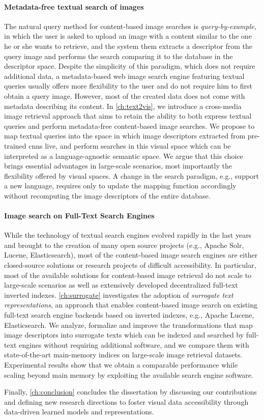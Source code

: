 \paragraph{Metadata-free textual search of images}
The natural query method for content-based image searches is \emph{query-by-example}, in which the user is asked to upload an image with a content similar to the one he or she wants to retrieve, and the system them extracts a descriptor from the query image and performs the search comparing it to the database in the descriptor space.
Despite the simplicity of this paradigm, which does not require additional data, a metadata-based web image search engine featuring textual queries usually offers more flexibility to the user and do not require him to first obtain a query image.
However, most of the created data does not come with metadata describing its content.
In \ref{ch:text2vis}, we introduce a cross-media image retrieval approach that aims to retain the ability to both express textual queries and perform metadata-free content-based image searches.
We propose to map textual queries into the space in which image descriptors extracted from pre-trained \glspl{cnn} live, and perform searches in this visual space which can be interpreted as a language-agnostic semantic space.
We argue that this choice brings essential advantages in large-scale scenarios, most importantly the flexibility offered by visual spaces.
A change in the search paradigm, e.g., support a new language, requires only to update the mapping function accordingly without recomputing the image descriptors of the entire database.

\paragraph{Image search on Full-Text Search Engines}
While the technology of textual search engines evolved rapidly in the last years and brought to the creation of many open source projects (e.g., Apache Solr, Lucene, Elasticsearch), most of the content-based image search engines are either closed-source solutions or research projects of difficult accessibility.
In particular, most of the available solutions for content-based image retrieval do not scale to large-scale scenarios as well as extensively developed decentralized full-text inverted indexes.
\ref{ch:surrogate} investigates the adoption of \emph{surrogate text representations}, an approach that enables content-based image search on existing full-text search engine backends based on inverted indexes, e.g., Apache Lucene, Elasticsearch.
We analyze, formalize and improve the transformations that map image descriptors into surrogate texts which can be indexed and searched by full-text engines without requiring additional software, and we compare them with state-of-the-art main-memory indices on large-scale image retrieval datasets.
Experimental results show that we obtain a comparable performance while scaling beyond main memory by exploiting the available search engine software.

Finally, \ref{ch:conclusion} concludes the dissertation by discussing our contributions and defining new research directions to foster visual data accessibility through data-driven learned models and representations.
